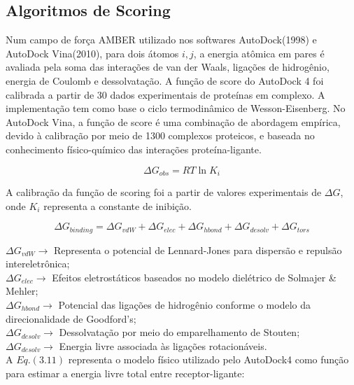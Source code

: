 \subsection{Algoritmos de Scoring}

Num campo de força AMBER utilizado nos softwares AutoDock(1998) e AutoDock Vina(2010), para dois átomos $i, j$, a energia atômica em pares é avaliada pela soma das interações de van der Waals, ligações de hidrogênio, energia de Coulomb e dessolvatação. \cite{Autodock1998} A função de score do AutoDock 4 foi calibrada a partir de 30 dados experimentais de proteínas em complexo. A implementação tem como base o ciclo termodinâmico de Wesson-Eisenberg.\cite{Autodock1998} No AutoDock Vina, a função de score é uma combinação de abordagem empírica, devido à calibração por meio de 1300 complexos proteicos, e baseada no conhecimento físico-químico das interações proteína-ligante. \cite{Vina2010}

\begin{equation}
    \Delta G_{obs} = RT \ln {K_i}
\end{equation}

A calibração da função de scoring foi a partir de valores experimentais de $\Delta G$, onde $K_i$ representa a constante de inibição. \cite{Autodock1998}

\begin{equation}
    \Delta G_{binding} = \Delta G_{vdW} + \Delta G_{elec} + \Delta G_{hbond} + \Delta G_{desolv} + \Delta G_{tors}
\end{equation}

$\Delta G_{vdW} \rightarrow$ Representa o potencial de Lennard-Jones para dispersão e repulsão intereletrônica; \\

$\Delta G_{elec} \rightarrow$ Efeitos eletrostáticos baseados no modelo dielétrico de Solmajer \& Mehler; \\

$\Delta G_{hbond} \rightarrow$ Potencial das ligações de hidrogênio conforme o modelo da direcionalidade de Goodford's; \\

$\Delta G_{desolv} \rightarrow$ Dessolvatação por meio do emparelhamento de Stouten; \\

$\Delta G_{desolv} \rightarrow$ Energia livre associada às ligações rotacionáveis. \\

A $Eq. (3.11)$ representa o modelo físico utilizado pelo AutoDock4 como função para estimar a energia livre total entre receptor-ligante: \cite{Autodock1998}

